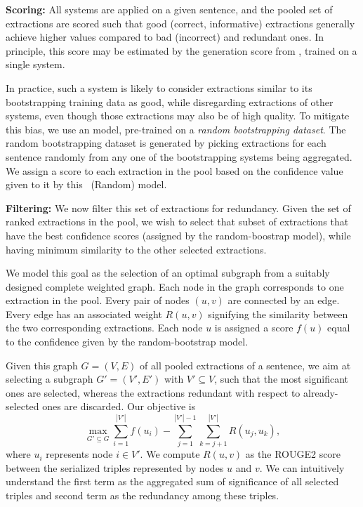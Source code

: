         \vspace{0.5ex}
        \noindent \textbf{Scoring:}
        All systems are applied on a given sentence, and the pooled set of extractions are scored such that good (correct, informative) extractions generally achieve higher values compared to bad (incorrect) and redundant ones.  In principle, this score may be estimated by the generation score from \shortname, trained on a single system. 
        
        In practice, such a system is likely to consider extractions similar to its bootstrapping training data as good, while disregarding extractions of other systems, even though those extractions may also be of high quality. 
        To mitigate this bias, we use an \shortname{} model, pre-trained on a \textit{random bootstrapping dataset}. The random bootstrapping dataset is generated by picking extractions for each sentence randomly from any one of the bootstrapping systems being aggregated. We assign a score to each extraction in the pool based on the confidence value given to it by this \shortname~(Random) model.

        \vspace{0.5ex}
        \noindent \textbf{Filtering:}
        We now filter this set of extractions for redundancy. 
        Given the set of ranked extractions in the pool, we wish to select that subset of extractions that have the best confidence scores (assigned by the random-boostrap model), while having minimum similarity to the other selected extractions.

        We model this goal as the selection of an optimal subgraph from a suitably designed complete weighted graph. Each node in the graph corresponds to one extraction in the pool. Every pair of nodes $(u,v)$ are connected by an edge. Every edge has an associated weight $R(u,v)$ signifying the similarity between the two corresponding extractions. Each node $u$ is assigned a score $f(u)$ equal to the confidence given by the random-bootstrap model.

        Given this graph $G = (V, E)$ of all pooled extractions of a sentence, we aim at selecting a subgraph $G' = (V', E')$ with $V' \subseteq V$, such that the most significant ones are selected, whereas the extractions redundant with respect to already-selected ones are discarded. Our objective is
        \begin{equation} \label{eq:1}
        \max_{G'\subseteq G} \sum_{i=1}^{|V'|} f(u_i) -
        \sum_{j=1}^{|V'|-1}\sum_{k=j+1}^{|V'|} R(u_{j},u_{k}),
        \end{equation}
        where $u_{i}$ represents node $i\in V'$.  
        We compute $R(u,v)$ as the ROUGE2 score between the serialized triples represented by nodes $u$ and $v$. We can intuitively understand the first term as the aggregated sum of significance of all selected triples and second term as the redundancy among these triples.

